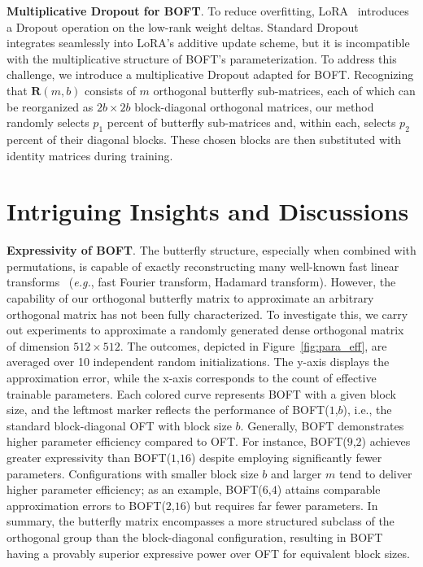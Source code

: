 \textbf{Multiplicative Dropout for BOFT}. To reduce overfitting, LoRA~\cite{hulora2022} introduces a Dropout operation on the low-rank weight deltas. Standard Dropout~\cite{srivastava2014dropout} integrates seamlessly into LoRA’s additive update scheme, but it is incompatible with the multiplicative structure of BOFT’s parameterization. To address this challenge, we introduce a multiplicative Dropout adapted for BOFT. Recognizing that $\bm{R}(m,b)$ consists of $m$ orthogonal butterfly sub-matrices, each of which can be reorganized as $2b\times 2b$ block-diagonal orthogonal matrices, our method randomly selects $p_1$ percent of butterfly sub-matrices and, within each, selects $p_2$ percent of their diagonal blocks. These chosen blocks are then substituted with identity matrices during training.

\section{Intriguing Insights and Discussions}

\textbf{Expressivity of BOFT}. The butterfly structure, especially when combined with permutations, is capable of exactly reconstructing many well-known fast linear transforms~\cite{dao2019learning,dao2019kaleidoscope} (\emph{e.g.}, fast Fourier transform, Hadamard transform). However, the capability of our orthogonal butterfly matrix to approximate an arbitrary orthogonal matrix has not been fully characterized. To investigate this, we carry out experiments to approximate a randomly generated dense orthogonal matrix~\cite{anderson1987generation} of dimension $512\times 512$. The outcomes, depicted in Figure~\ref{fig:para_eff}, are averaged over 10 independent random initializations. The y-axis displays the approximation error, while the x-axis corresponds to the count of effective trainable parameters. Each colored curve represents BOFT with a given block size, and the leftmost marker reflects the performance of BOFT($1$,$b$), i.e., the standard block-diagonal OFT with block size $b$. Generally, BOFT demonstrates higher parameter efficiency compared to OFT. For instance, BOFT($9$,$2$) achieves greater expressivity than BOFT($1$,$16$) despite employing significantly fewer parameters. Configurations with smaller block size $b$ and larger $m$ tend to deliver higher parameter efficiency; as an example, BOFT($6$,$4$) attains comparable approximation errors to BOFT($2$,$16$) but requires far fewer parameters. In summary, the butterfly matrix encompasses a more structured subclass of the orthogonal group than the block-diagonal configuration, resulting in BOFT having a provably superior expressive power over OFT for equivalent block sizes.

